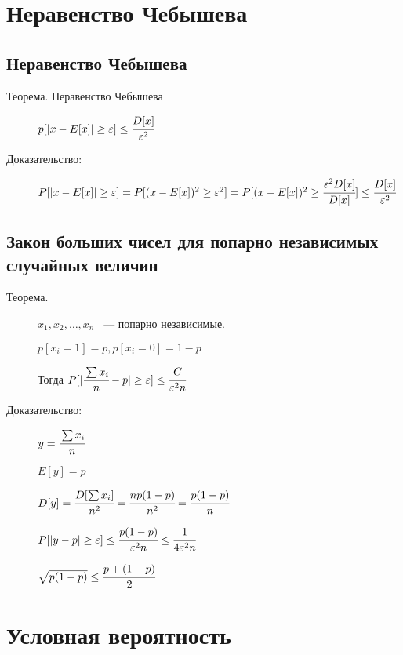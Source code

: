 \documentclass[12pt]{article}
\renewcommand{\epsilon}{\varepsilon}
\begin{document}
\begin{description}
\begin{description}
\end{description}

\section{Неравенство Чебышева}

\subsection{Неравенство Чебышева}

\begin{description}
\item[Теорема. Неравенство Чебышева]

$p[|x - E[x]| \ge \epsilon] \le \cfrac{D[x]}{\epsilon^2}$

\item[Доказательство:]

$P[|x - E[x]| \ge \epsilon] = P[(x - E[x])^2 \ge \epsilon^2] = P[(x - E[x])^2 \ge \cfrac{\epsilon^2 D[x]}{D[x]}] \le \cfrac{D[x]}{\epsilon^2}$
\end{description}

\subsection{Закон больших чисел для попарно независимых случайных величин}

\begin{description}

\item [Теорема.]
$x_1, x_2, \ldots, x_n$ ~--- попарно независимые.

$p[x_i = 1] = p, p[x_i = 0] = 1 - p$

Тогда $P[|\cfrac{\sum x_i}{n} - p| \ge \epsilon] \le \cfrac{C}{\epsilon^2 n}$

\item[Доказательство:]

$y = \cfrac{\sum x_i}{n}$

$E[y] = p$

$D[y] = \cfrac{D[\sum x_i]}{n^2} = \cfrac{n p(1 - p)}{n^2} = \cfrac{p (1 - p)}{n}$

$P[|y - p| \ge \epsilon] \le \cfrac{p(1 - p)}{\epsilon^2 n} \le \cfrac{1}{4 \epsilon^2 n}$

$\sqrt{p(1 - p)} \le \cfrac{p + (1 - p)}{2}$

\end{description}

\section{Условная вероятность}


\end{description}
\end{document}
